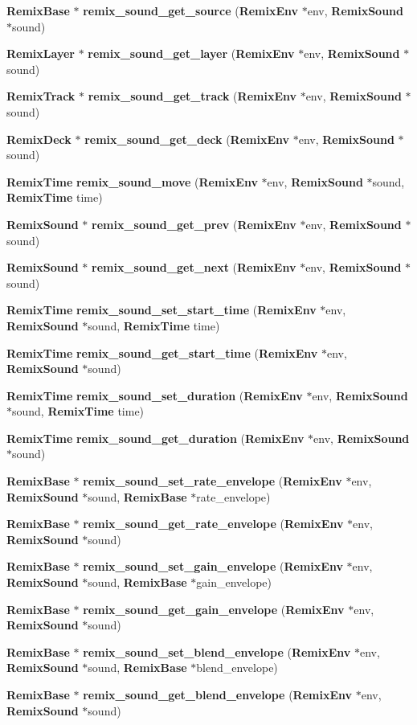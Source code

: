 \begin{CompactItemize}
\item 
{\bf Remix\-Base} $\ast$ {\bf remix\_\-sound\_\-get\_\-source} ({\bf Remix\-Env} $\ast$env, {\bf Remix\-Sound} $\ast$sound)
\item 
{\bf Remix\-Layer} $\ast$ {\bf remix\_\-sound\_\-get\_\-layer} ({\bf Remix\-Env} $\ast$env, {\bf Remix\-Sound} $\ast$sound)
\item 
{\bf Remix\-Track} $\ast$ {\bf remix\_\-sound\_\-get\_\-track} ({\bf Remix\-Env} $\ast$env, {\bf Remix\-Sound} $\ast$sound)
\item 
{\bf Remix\-Deck} $\ast$ {\bf remix\_\-sound\_\-get\_\-deck} ({\bf Remix\-Env} $\ast$env, {\bf Remix\-Sound} $\ast$sound)
\item 
{\bf Remix\-Time} {\bf remix\_\-sound\_\-move} ({\bf Remix\-Env} $\ast$env, {\bf Remix\-Sound} $\ast$sound, {\bf Remix\-Time} time)
\item 
{\bf Remix\-Sound} $\ast$ {\bf remix\_\-sound\_\-get\_\-prev} ({\bf Remix\-Env} $\ast$env, {\bf Remix\-Sound} $\ast$sound)
\item 
{\bf Remix\-Sound} $\ast$ {\bf remix\_\-sound\_\-get\_\-next} ({\bf Remix\-Env} $\ast$env, {\bf Remix\-Sound} $\ast$sound)
\item 
{\bf Remix\-Time} {\bf remix\_\-sound\_\-set\_\-start\_\-time} ({\bf Remix\-Env} $\ast$env, {\bf Remix\-Sound} $\ast$sound, {\bf Remix\-Time} time)
\item 
{\bf Remix\-Time} {\bf remix\_\-sound\_\-get\_\-start\_\-time} ({\bf Remix\-Env} $\ast$env, {\bf Remix\-Sound} $\ast$sound)
\item 
{\bf Remix\-Time} {\bf remix\_\-sound\_\-set\_\-duration} ({\bf Remix\-Env} $\ast$env, {\bf Remix\-Sound} $\ast$sound, {\bf Remix\-Time} time)
\item 
{\bf Remix\-Time} {\bf remix\_\-sound\_\-get\_\-duration} ({\bf Remix\-Env} $\ast$env, {\bf Remix\-Sound} $\ast$sound)
\item 
{\bf Remix\-Base} $\ast$ {\bf remix\_\-sound\_\-set\_\-rate\_\-envelope} ({\bf Remix\-Env} $\ast$env, {\bf Remix\-Sound} $\ast$sound, {\bf Remix\-Base} $\ast$rate\_\-envelope)
\item 
{\bf Remix\-Base} $\ast$ {\bf remix\_\-sound\_\-get\_\-rate\_\-envelope} ({\bf Remix\-Env} $\ast$env, {\bf Remix\-Sound} $\ast$sound)
\item 
{\bf Remix\-Base} $\ast$ {\bf remix\_\-sound\_\-set\_\-gain\_\-envelope} ({\bf Remix\-Env} $\ast$env, {\bf Remix\-Sound} $\ast$sound, {\bf Remix\-Base} $\ast$gain\_\-envelope)
\item 
{\bf Remix\-Base} $\ast$ {\bf remix\_\-sound\_\-get\_\-gain\_\-envelope} ({\bf Remix\-Env} $\ast$env, {\bf Remix\-Sound} $\ast$sound)
\item 
{\bf Remix\-Base} $\ast$ {\bf remix\_\-sound\_\-set\_\-blend\_\-envelope} ({\bf Remix\-Env} $\ast$env, {\bf Remix\-Sound} $\ast$sound, {\bf Remix\-Base} $\ast$blend\_\-envelope)
\item 
{\bf Remix\-Base} $\ast$ {\bf remix\_\-sound\_\-get\_\-blend\_\-envelope} ({\bf Remix\-Env} $\ast$env, {\bf Remix\-Sound} $\ast$sound)
\end{CompactItemize}


